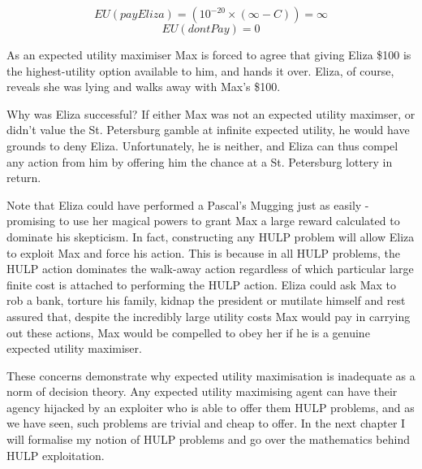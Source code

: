 \documentclass{article}
\begin{document}
\[EU(payEliza)=(10^{-20}\times(\infty-C)) = \infty\]
\[EU(dontPay)=0\]

As an expected utility maximiser Max is forced to agree that giving Eliza \$100 is the highest-utility option available to him, and hands it over. Eliza, of course, reveals she was lying and walks away with Max's \$100.

Why was Eliza successful? If either Max was not an expected utility maximser, or didn't value the St. Petersburg gamble at infinite expected utility, he would have grounds to deny Eliza. Unfortunately, he is neither, and Eliza can thus compel any action from him by offering him the chance at a St. Petersburg lottery in return. 

Note that Eliza could have performed a Pascal's Mugging just as easily - promising to use her magical powers to grant Max a large reward calculated to dominate his skepticism. In fact, constructing any HULP problem will allow Eliza to exploit Max and force his action. This is because in all HULP problems, the HULP action dominates the walk-away action regardless of which particular large finite cost is attached to performing the HULP action. Eliza could ask Max to rob a bank, torture his family, kidnap the president or mutilate himself and rest assured that, despite the incredibly large utility costs Max would pay in carrying out these actions, Max would be compelled to obey her if he is a genuine expected utility maximiser.

These concerns demonstrate why expected utility maximisation is inadequate as a norm of decision theory. Any expected utility maximising agent can have their agency hijacked by an exploiter who is able to offer them HULP problems, and as we have seen, such problems are trivial and cheap to offer. In the next chapter I will formalise my notion of HULP problems and go over the mathematics behind HULP exploitation.


\end{document}
